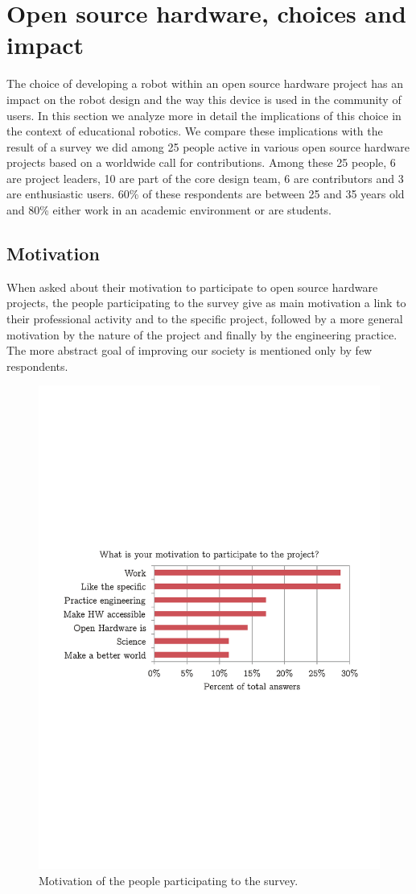 \documentclass[letterpaper, 10 pt, conference]{ieeeconf}  %
\begin{document}
\section{Open source hardware, choices and impact}

The choice of developing a robot within an open source hardware project has an impact on the robot design and the way this device is used in the community of users. 
In this section we analyze more in detail the implications of this choice in the context of educational robotics.
We compare these implications with the result of a survey we did among 25 people active in various open source hardware projects based on a worldwide call for contributions. 
Among these 25 people, 6 are project leaders, 10 are part of the core design team, 6 are contributors and 3 are enthusiastic users.
60\% of these respondents are between 25 and 35 years old and 80\% either work in an academic environment or are students. 

\subsection{Motivation}

When asked about their motivation to participate to open source hardware projects, the people participating to the survey give as main motivation a link to their professional activity and to the specific project, followed by a more general motivation by the nature of the project and finally by the engineering practice. 
The more abstract goal of improving our society is mentioned only by few respondents.

\begin{figure}
\centering
\includegraphics[width=.7\columnwidth]{figures/motivation}
\caption{Motivation of the people participating to the survey.}
\label{fig:motivation}
\end{figure}
\end{document}
